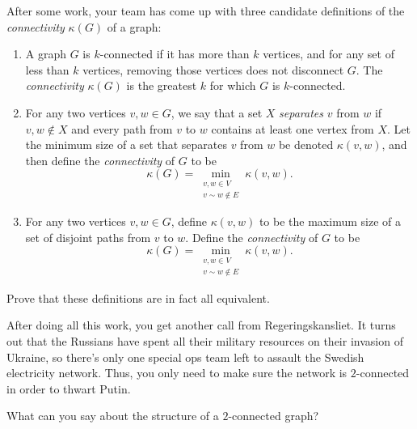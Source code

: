 \documentclass[nobib]{tufte-handout}
\begin{document}
After some work, your team has come up with three candidate definitions of the \emph{connectivity} $\kappa(G)$ of a graph:
\begin{enumerate}
  \item A graph $G$ is $k$-connected if it has more than $k$ vertices, and for any set of less than $k$ vertices, removing those vertices does not disconnect $G$. The \emph{connectivity} $\kappa(G)$ is the greatest $k$ for which $G$ is $k$-connected.
  \item For any two vertices $v, w \in G$, we say that a set $X$ \emph{separates} $v$ from $w$ if $v, w \not\in X$ and every path from $v$ to $w$ contains at least one vertex from $X$. Let the minimum size of a set that separates $v$ from $w$ be denoted $\kappa(v,w)$, and then define the \emph{connectivity} of $G$ to be
  $$\kappa(G) = \min_{\substack{v, w \in V\\v\sim w \not\in E}} \kappa(v,w).$$
  \item For any two vertices $v, w \in G$, define $\kappa(v,w)$ to be the maximum size of a set of disjoint paths from $v$ to $w$. Define the \emph{connectivity} of $G$ to be
  $$\kappa(G) = \min_{\substack{v, w \in V\\v\sim w \not\in E}} \kappa(v,w).$$
\end{enumerate}

\begin{xca}
  Prove that these definitions are in fact all equivalent.
\end{xca}

After doing all this work, you get another call from Regeringskansliet. It turns out that the Russians have spent all their military resources on their invasion of Ukraine, so there's only one special ops team left to assault the Swedish electricity network. Thus, you only need to make sure the network is $2$-connected in order to thwart Putin.

\begin{xca}
  What can you say about the structure of a $2$-connected graph?
\end{xca}
\end{document}

